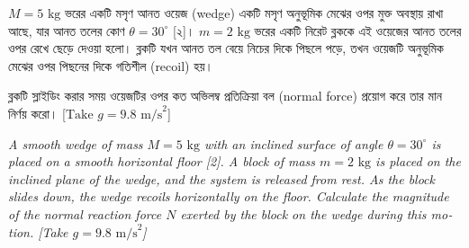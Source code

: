 \documentclass[12pt, a4paper]{article}
\begin{document}
\begin{tcolorbox}[questionbox={প্রশ্ন (Question) 5}]
\noindent
$M = 5\text{ kg}$ ভরের একটি মসৃণ আনত ওয়েজ (wedge) একটি মসৃণ অনুভূমিক মেঝের ওপর মুক্ত অবস্থায় রাখা আছে, যার আনত তলের কোণ $\theta = 30^\circ$ [২]। $m = 2\text{ kg}$ ভরের একটি নিরেট ব্লককে এই ওয়েজের আনত তলের ওপর রেখে ছেড়ে দেওয়া হলো। ব্লকটি যখন আনত তল বেয়ে নিচের দিকে পিছলে পড়ে, তখন ওয়েজটি অনুভূমিক মেঝের ওপর পিছনের দিকে গতিশীল (recoil) হয়। 

\vspace{0.3em}
\noindent
ব্লকটি স্লাইডিং করার সময় ওয়েজটির ওপর কত অভিলম্ব প্রতিক্রিয়া বল (normal force) প্রয়োগ করে তার মান নির্ণয় করো। [$\text{Take } g = 9.8\text{ m/s}^2$]

\vspace{0.8em}
\begin{english}
\noindent\textit{\color{darkgray}
A smooth wedge of mass $M = 5\text{ kg}$ with an inclined surface of angle $\theta = 30^\circ$ is placed on a smooth horizontal floor [2]. A block of mass $m = 2\text{ kg}$ is placed on the inclined plane of the wedge, and the system is released from rest. As the block slides down, the wedge recoils horizontally on the floor. Calculate the magnitude of the normal reaction force $N$ exerted by the block on the wedge during this motion. [Take $g = 9.8\text{ m/s}^2$]
}
\end{english}
\end{tcolorbox}
\end{document}
